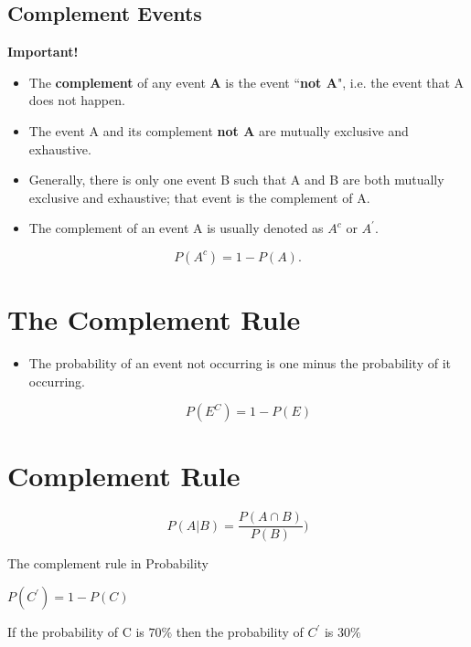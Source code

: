 \documentclass[]{report}
\begin{document}

\subsection{Complement Events}

\textbf{Important!}
\begin{itemize}
	
	\item The \textbf{complement} of any event \textbf{A} is the event ``\textbf{not A}", i.e. the event that A does not happen.
	\item The event A and its complement \textbf{not A} are mutually exclusive and exhaustive. 
	\item Generally, there is only one event B such that A and B are both mutually exclusive and exhaustive; that event is the complement of A. 
	\item The complement of an event A is usually denoted as $A^{c}$ or $A^{\prime}$.
	
\end{itemize}

\[P(A^{c})=1-P(A).\]


\section{The Complement Rule}
\begin{itemize}
	\item 
	The probability of an event not occurring is one minus the probability of it occurring.
	
	\[P(E^{C}) = 1 - P(E)\]
\end{itemize}
\section*{Complement Rule}



\[P(A |B) = \frac{P(A \cap B)}{P(B)})\]

The complement rule in Probability

$P(C^{\prime}) = 1- P(C)$


If the probability of C is $70 \%$ then the probability of $C^{\prime}$ is $30\%$
\end{document}

